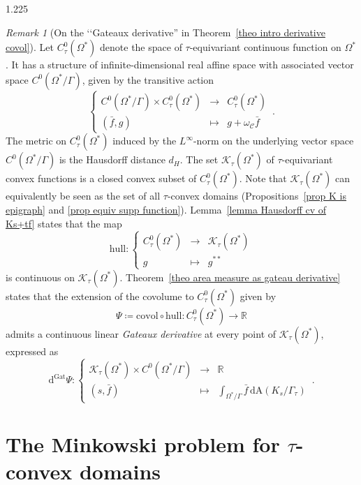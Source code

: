 \documentclass[reqno, a4paper]{amsart}
\numberwithin{equation}{section}
\numberwithin{figure}{section}
\theoremstyle{definition}
\theoremstyle{remark}
\newtheorem{remark}[theorem]{Remark}
\newcommand{\R}{\mathbb{R}} %
\newcommand{\dif}{\mathrm{d}} %
\newcommand{\C}{\mathcal{C}} %
\newcommand{\covol}{\mathrm{covol}} %
\newcommand{\Area}{\mathrm{A}} %
\newcommand{\namelessfunction}[4]{ \left\lbrace \begin{matrix}
{#1} &\longrightarrow& {#2}\\
{#3} & \longmapsto & {#4}
\end{matrix} \right. }
\newcommand{\function}[5]{{#1}: \namelessfunction{#2}{#3}{#4}{#5}}
\begin{document}
\begin{spacing}{1.225}
\begin{remark}[On the ‘‘Gateaux derivative'' in Theorem~\ref{theo intro derivative covol}]
\label{rem Gateaux derivative}
Let $C^0_\tau(\Omega^*)$ denote the space of $\tau$-equivariant continuous function on $\Omega^*$. It has a structure of infinite-dimensional real affine space with associated vector space $C^0(\Omega^*/\Gamma)$, given by the transitive action
\begin{equation*}
 \namelessfunction{C^0(\Omega^*/\Gamma)\times C^0_\tau(\Omega^*)}{C^0_\tau(\Omega^*)}{(\bar{f},g)}{g +\omega_\C \bar{f}} \, . 
\end{equation*}
The metric on $C^0_\tau(\Omega^*)$ induced by the $L^\infty$-norm on the underlying vector space $C^0(\Omega^*/\Gamma)$ is the Hausdorff distance $d_H$. 
The set $\mathcal{K}_\tau(\Omega^*)$ of $\tau$-equivariant convex functions is a closed convex subset of $C^0_\tau(\Omega^*)$. Note that $\mathcal{K}_\tau(\Omega^*)$ can equivalently be seen as the set of all $\tau$-convex domains (Propositions~\ref{prop K is epigraph} and \ref{prop equiv supp function}). 
Lemma~\ref{lemma Hausdorff cv of Ks+tf} states that the map
\begin{equation*}
 \function{\mathrm{hull}}{C^0_\tau(\Omega^*)}{\mathcal{K}_\tau(\Omega^*)}{g}{g^{**}}
\end{equation*}
is continuous on $\mathcal{K}_\tau(\Omega^*)$. 
Theorem~\ref{theo area measure as gateau derivative} states that the extension of the covolume to $C^0_\tau(\Omega^*)$ given by 
\begin{equation*}
 \Psi \coloneqq \covol \circ \mathrm{hull} : C^0_\tau(\Omega^*) \longrightarrow \R 
\end{equation*}
admits a continuous linear \emph{Gateaux derivative} at every point of $\mathcal{K}_\tau(\Omega^*)$, expressed as 
\begin{equation*}
 \function{\dif^{\mathrm{Gat}} \Psi}{\mathcal{K}_\tau(\Omega^*) \times C^0(\Omega^*/\Gamma)}{\R}{(s,\bar f)}{\int_{\Omega^*/\Gamma} \bar f \,\dif \Area(K_s/\Gamma_\tau)} \, . 
\end{equation*}
\end{remark}



\section{\texorpdfstring{The Minkowski problem for $\tau$-convex domains}{The Minkowski problem for tau-convex domains}}
\label{sec inv Mink pb}


\end{spacing}
\end{document}
